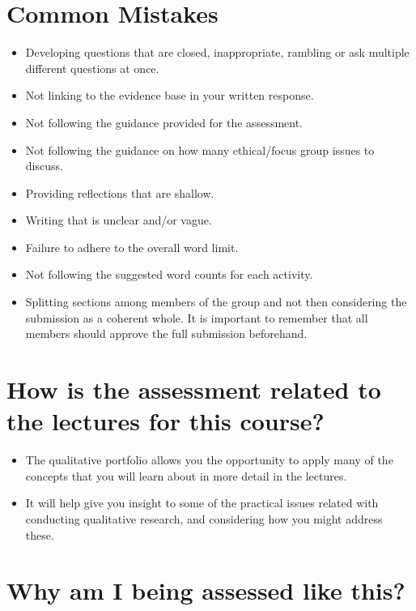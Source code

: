 \documentclass[
  english,
  letterpaper,
  DIV=11,
  numbers=noendperiod]{scrreprt}
\begin{document}
\section{Common Mistakes}\label{common-mistakes-2}

\begin{itemize}
\item
  Developing questions that are closed, inappropriate, rambling or ask
  multiple different questions at once.
\item
  Not linking to the evidence base in your written response.
\item
  Not following the guidance provided for the assessment.
\item
  Not following the guidance on how many ethical/focus group issues to
  discuss.
\item
  Providing reflections that are shallow.
\item
  Writing that is unclear and/or vague.
\item
  Failure to adhere to the overall word limit.
\item
  Not following the suggested word counts for each activity.
\item
  Splitting sections among members of the group and not then considering
  the submission as a coherent whole. It is important to remember that
  all members should approve the full submission beforehand.
\end{itemize}

\section{How is the assessment related to the lectures for this
course?}\label{how-is-the-assessment-related-to-the-lectures-for-this-course-2}

\begin{itemize}
\item
  The qualitative portfolio allows you the opportunity to apply many of
  the concepts that you will learn about in more detail in the lectures.
\item
  It will help give you insight to some of the practical issues related
  with conducting qualitative research, and considering how you might
  address these.
\end{itemize}

\section{Why am I being assessed like
this?}\label{why-am-i-being-assessed-like-this-2}
\end{document}

